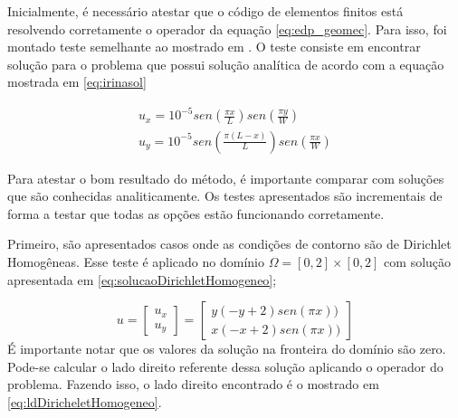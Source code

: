 Inicialmente, é necessário atestar que o código de elementos finitos está resolvendo corretamente o operador da equação \ref{eq:edp_geomec}. Para isso, foi montado teste semelhante ao mostrado em \cite{irina}. O teste consiste em encontrar solução para o problema que possui solução analítica de acordo com a equação mostrada em \ref{eq:irinasol}


\begin{equation} \label{eq:irinasol}
  \begin{aligned}
  u_x = 10^{-5} sen(\frac{\pi x}{L}) sen(\frac{\pi y}{W})  \\
  u_y = 10^{-5} sen(\frac{\pi (L-x)}{L}) sen(\frac{\pi x}{W})
  \end{aligned}
\end{equation}



Para atestar o bom resultado do método, é importante comparar com soluções que são conhecidas analiticamente. Os testes apresentados são incrementais de forma a testar que todas as opções estão funcionando corretamente.

Primeiro, são apresentados casos onde as condições de contorno são de Dirichlet Homogêneas. Esse teste é aplicado no domínio $ \Omega = [0, 2] \times [0, 2]$ com solução apresentada em \ref{eq:solucaoDirichletHomogeneo};

\begin{equation}\label{eq:solucaoDirichletHomogeneo}
u = 
\begin{bmatrix}
u_x
\\ 
u_y
\end{bmatrix}
=
\begin{bmatrix}
y(-y+2)sen(\pi x))
\\ 
x(-x+2)sen(\pi x))
\end{bmatrix}
\end{equation}É importante notar que os valores da solução na fronteira do domínio são zero. Pode-se calcular o lado direito referente dessa solução aplicando o operador do problema. Fazendo isso, o lado direito encontrado é o mostrado em \ref{eq:ldDiricheletHomogeneo}.

